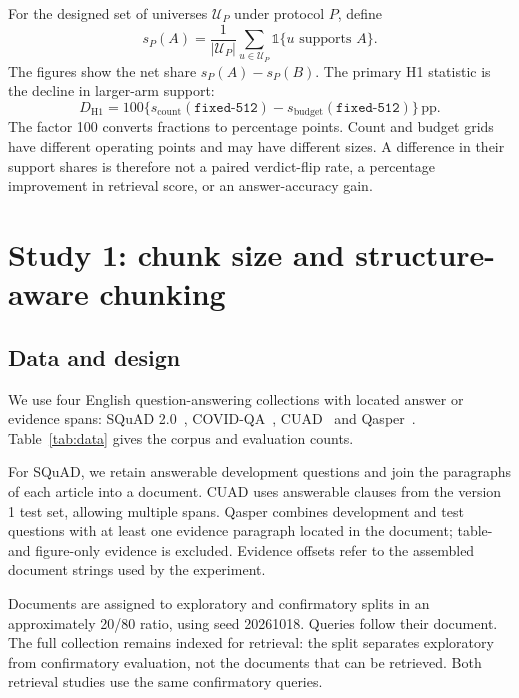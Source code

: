 \documentclass[11pt]{article}
\newcommand{\pp}{\ensuremath{\,\mathrm{pp}}}
\newcommand{\chunk}[1]{\texttt{#1}}
\newcommand{\ind}{\mathbb{1}}
\begin{document}
For the designed set of universes $\mathcal U_P$ under protocol $P$, define
\begin{equation}
s_P(A)=\frac{1}{|\mathcal U_P|}\sum_{u\in\mathcal U_P}\ind\{u\text{ supports }A\}.
\label{eq:share}
\end{equation}
The figures show the net share $s_P(A)-s_P(B)$. The primary H1 statistic is the decline in larger-arm support:
\begin{equation}
D_{\mathrm{H1}}=100\{s_{\mathrm{count}}(\chunk{fixed-512})-s_{\mathrm{budget}}(\chunk{fixed-512})\}\pp.
\label{eq:h1}
\end{equation}
The factor 100 converts fractions to percentage points. Count and budget grids have different operating points and may have different sizes. A difference in their support shares is therefore not a paired verdict-flip rate, a percentage improvement in retrieval score, or an answer-accuracy gain.

\section{Study 1: chunk size and structure-aware chunking}\label{sec:study1}
\subsection{Data and design}
We use four English question-answering collections with located answer or evidence spans: SQuAD 2.0~\cite{rajpurkar2018squad2}, COVID-QA~\cite{moller2020covidqa}, CUAD~\cite{hendrycks2021cuad} and Qasper~\cite{dasigi2021qasper}. Table~\ref{tab:data} gives the corpus and evaluation counts.

For SQuAD, we retain answerable development questions and join the paragraphs of each article into a document. CUAD uses answerable clauses from the version 1 test set, allowing multiple spans. Qasper combines development and test questions with at least one evidence paragraph located in the document; table- and figure-only evidence is excluded. Evidence offsets refer to the assembled document strings used by the experiment.

Documents are assigned to exploratory and confirmatory splits in an approximately 20/80 ratio, using seed 20261018. Queries follow their document. The full collection remains indexed for retrieval: the split separates exploratory from confirmatory evaluation, not the documents that can be retrieved. Both retrieval studies use the same \EoneNq{} confirmatory queries.

\end{document}
